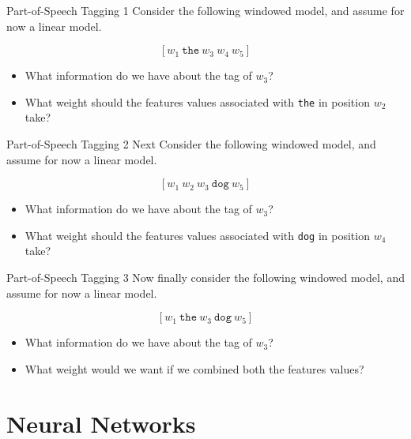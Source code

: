 \documentclass{beamer}
\begin{document}
\begin{frame}{Part-of-Speech Tagging 1}
  Consider the following windowed model, and
  assume for now a linear model.

  \[ [ w_1\ \mathrm{\texttt{the}}\ w_3\ w_4\ w_5 ]\]


  \begin{itemize}
  \item What information do we have about the tag of $w_3$?
    \air

  \item What weight should the features values associated with
    \texttt{the} in position $w_2$ take?
  \end{itemize}
\end{frame}

\begin{frame}{Part-of-Speech Tagging 2}
  Next Consider the following windowed model, and
  assume for now a linear model.

  \[[ w_1\ w_2 \ w_3\ \mathrm{\texttt{dog}} \ w_5 ]\]


  \begin{itemize}
  \item What information do we have about the tag of $w_3$?
    \air

  \item What weight should the features values associated with
    \texttt{dog} in position $w_4$ take?
  \end{itemize}

\end{frame}


\begin{frame}{Part-of-Speech Tagging 3}
  Now finally consider the following windowed model, and
  assume for now a linear model.

  \[[w_1\ \texttt{the} \ w_3\ \mathrm{\texttt{dog}} \ w_5] \]


  \begin{itemize}
  \item What information do we have about the tag of $w_3$?
    \air

  \item What weight would we want if we combined both the features values?
  \end{itemize}

\end{frame}

\section{Neural Networks}
\end{document}
